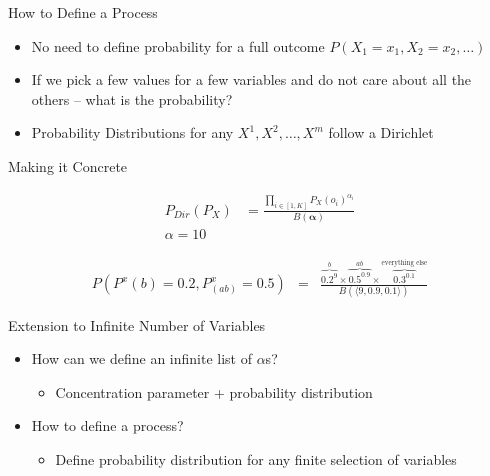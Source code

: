 \documentclass[11pt]{beamer}
\begin{document}
	\begin{frame}{How to Define a Process}
		\begin{itemize}
			\item No need to define probability for a full outcome $P(X_1=x_1,X_2=x_2,\dots)$
			\item If we pick a few values for a few variables and do not care about all the others -- what is the probability?
			\item Probability Distributions for any $X^1,X^2,\dots,X^m$ follow a Dirichlet
		\end{itemize}
	\end{frame}
	
	\begin{frame}{Making it Concrete}
		\centering
		
		
		\begin{align*}
			P_{Dir}(P_X) & = \frac{\prod_{i \in [1,K]} P_{X}(o_i)^{\alpha_i}}{B(\boldsymbol{\alpha})} \\
			\alpha = 10
		\end{align*}
		
		\begin{align*}
		P(P^x(b) = 0.2,P^x_(ab) = 0.5) & = &
		\frac{\overbrace{0.2^{9}}^{b} \times \overbrace{0.5^{0.9}}^{ab} \times
			\overbrace{0.3^{0.1}}^{\text{everything else}}}{B(\langle 9,0.9,0.1 \rangle)}
		\end{align*}
	\end{frame}
	
	\begin{frame}{Extension to Infinite Number of Variables}
		\begin{itemize}
			\item How can we define an infinite list of $\alpha$s?
			\begin{itemize}
				\item Concentration parameter + probability distribution \checkmark
			\end{itemize}
			\item How to define a process?
			\begin{itemize}
				\item Define probability distribution for any finite selection of variables
			\end{itemize}
		\end{itemize}
	\end{frame}
	
\end{document}
